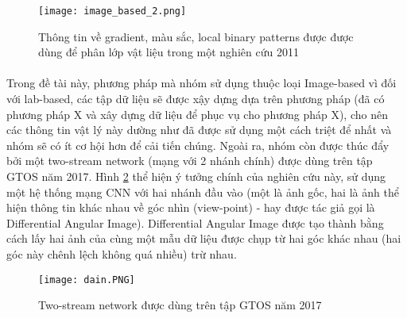 \begin{figure}[h!]
	\centering
	\captionsetup{width=0.9\textwidth}
	\texttt{[image: image\_based\_2.png]}
	\caption{Thông tin về gradient, màu sắc, local binary patterns được được dùng để phân lớp vật liệu trong một nghiên cứu 2011 \cite{hu2011toward}}
    \label{fig:image_based_2}
\end{figure}

\pagebreak
\paragraph*{}
Trong đề tài này, phương pháp mà nhóm sử dụng thuộc loại Image-based vì đối với lab-based, các tập dữ liệu sẽ được xậy dựng dựa trên phương pháp (đã có phương pháp X và xây dựng dữ liệu để phục vụ cho phương pháp X), cho nên các thông tin vật lý này dường như đã được sử dụng một cách triệt để nhất và nhóm sẽ có ít cơ hội hơn để cải tiến chúng. Ngoài ra, nhóm còn được thúc đẩy bởi một two-stream network (mạng với 2 nhánh chính) được dùng trên tập GTOS năm 2017\cite{xue2017differential}. Hình \ref{fig:dain} thể hiện ý tưởng chính của nghiên cứu này, sử dụng một hệ thống mạng CNN với hai nhánh đầu vào (một là ảnh gốc, hai là ảnh thể hiện thông tin khác nhau về góc nhìn (view-point) - hay được tác giả gọi là Differential Angular Image). Differential Angular Image được tạo thành bằng cách lấy hai ảnh của cùng một mẫu dữ liệu được chụp từ hai góc khác nhau (hai góc này chênh lệch không quá nhiều) trừ nhau. 

\begin{figure}[h!]
	\centering
	\captionsetup{width=0.9\textwidth}
	\texttt{[image: dain.PNG]}
	\caption{Two-stream network được dùng trên tập GTOS năm 2017 \cite{xue2017differential}}
    \label{fig:dain}
\end{figure}